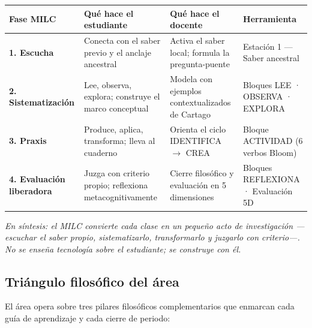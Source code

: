 \documentclass[12pt, a4paper]{article}
\begin{document}
\begin{center}
\setlength{\tabcolsep}{4pt}
\begin{tabular}{|L{3cm}|L{4cm}|L{4cm}|L{3cm}|}
\hline
{}
\color{white}\textbf{Fase MILC} &
\color{white}\textbf{Qué hace el estudiante} &
\color{white}\textbf{Qué hace el docente} &
\color{white}\textbf{Herramienta} \\
\hline
\textbf{1. Escucha} &
Conecta con el saber previo y el anclaje ancestral &
Activa el saber local; formula la pregunta-puente &
Estación 1 — Saber ancestral \\
\hline
\textbf{2. Sistematización} &
Lee, observa, explora; construye el marco conceptual &
Modela con ejemplos contextualizados de Cartago &
Bloques LEE · OBSERVA · EXPLORA \\
\hline
\textbf{3. Praxis} &
Produce, aplica, transforma; lleva al cuaderno &
Orienta el ciclo IDENTIFICA $\rightarrow$ CREA &
Bloque ACTIVIDAD (6 verbos Bloom) \\
\hline
\textbf{4. Evaluación liberadora} &
Juzga con criterio propio; reflexiona metacognitivamente &
Cierre filosófico y evaluación en 5 dimensiones &
Bloques REFLEXIONA · Evaluación 5D \\
\hline
\end{tabular}
\end{center}

\medskip
\noindent\textit{En síntesis: el MILC convierte cada clase en un pequeño acto de
investigación —escuchar el saber propio, sistematizarlo, transformarlo y juzgarlo
con criterio—. No se enseña tecnología \emph{sobre} el estudiante; se construye
\emph{con} él.}

\subsection{Triángulo filosófico del área}

El área opera sobre tres pilares filosóficos complementarios que enmarcan cada
guía de aprendizaje y cada cierre de periodo:
\end{document}
